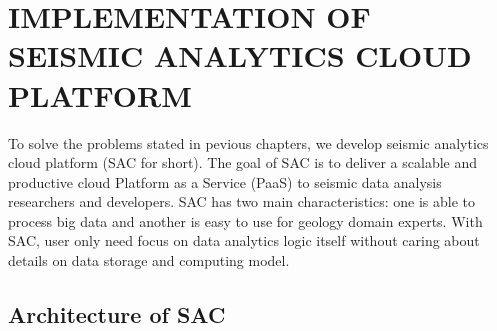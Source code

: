 %
%
%

\chapter{\uppercase{Implementation of Seismic Analytics Cloud Platform}}
To solve the problems stated in pevious chapters, we develop seismic analytics cloud platform (SAC for short). The goal of SAC is to deliver a scalable and productive cloud Platform as a Service (PaaS) to seismic data analysis researchers and developers. SAC has two main characteristics: one is able to process big data and another is easy to use for geology domain experts. With SAC, user only need focus on data analytics logic itself without caring about details on data storage and computing model. 


\section{Architecture of SAC}

